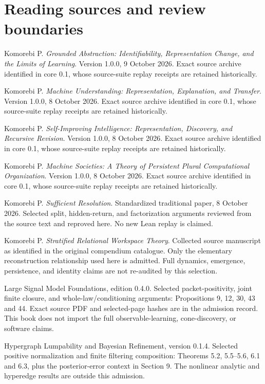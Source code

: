 \documentclass[11pt,oneside,openany]{book}
\theoremstyle{definition}\newtheorem{definition}[theorem]{Definition}
\begin{document}
\chapter{Reading sources and review boundaries}
\begin{description}[style=nextline]
\item[GA] Komorebi P. \emph{Grounded Abstraction: Identifiability, Representation Change, and the Limits of Learning}. Version 1.0.0, 9 October 2026. Exact source archive identified in core 0.1, whose source-suite replay receipts are retained historically.
\item[MU] Komorebi P. \emph{Machine Understanding: Representation, Explanation, and Transfer}. Version 1.0.0, 8 October 2026. Exact source archive identified in core 0.1, whose source-suite replay receipts are retained historically.
\item[SII] Komorebi P. \emph{Self-Improving Intelligence: Representation, Discovery, and Recursive Revision}. Version 1.0.0, 8 October 2026. Exact source archive identified in core 0.1, whose source-suite replay receipts are retained historically.
\item[MS] Komorebi P. \emph{Machine Societies: A Theory of Persistent Plural Computational Organization}. Version 1.0.0, 8 October 2026. Exact source archive identified in core 0.1, whose source-suite replay receipts are retained historically.
\item[SR] Komorebi P. \emph{Sufficient Resolution}. Standardized traditional paper, 8 October 2026. Selected split, hidden-return, and factorization arguments reviewed from the source text and reproved here. No new Lean replay is claimed.
\item[SRWT] Komorebi P. \emph{Stratified Relational Workspace Theory}. Collected source manuscript as identified in the original compendium catalogue. Only the elementary reconstruction relationship used here is admitted. Full dynamics, emergence, persistence, and identity claims are not re-audited by this selection.
\item[LSM] Large Signal Model Foundations, edition 0.4.0.
Selected packet-positivity, joint finite closure, and whole-law/conditioning arguments: Propositions 9, 12, 30, 43 and 44. Exact source PDF and selected-page hashes are in the admission record. This book does not import the full observable-learning, cone-discovery, or software claims.

\item[PRIQ] Hypergraph Lumpability and Bayesian Refinement, version 0.1.4.
Selected positive normalization and finite filtering composition: Theorems 5.2, 5.5--5.6, 6.1 and 6.3, plus the posterior-error context in Section 9. The nonlinear analytic and hyperedge results are outside this admission.


\end{description}
\end{document}
